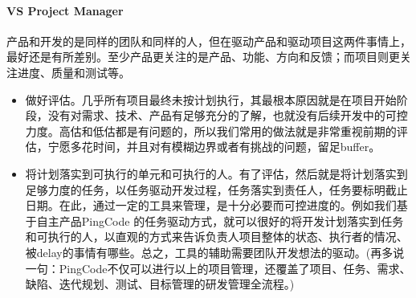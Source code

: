 \documentclass[letterpaper,10pt,english]{sphinxmanual}
\begin{document}
\paragraph{VS Project Manager}
\label{\detokenize{chapter_knowledge/project_manage:vs-project-manager}}
产品和开发的是同样的团队和同样的人，但在驱动产品和驱动项目这两件事情上，最好还是有所差别。至少产品更关注的是产品、功能、方向和反馈；而项目则更关注进度、质量和测试等。
\begin{itemize}
\item {} 
做好评估。几乎所有项目最终未按计划执行，其最根本原因就是在项目开始阶段，没有对需求、技术、产品有足够充分的了解，也就没有后续开发中的可控力度。高估和低估都是有问题的，所以我们常用的做法就是非常重视前期的评估，宁愿多花时间，并且对有模糊边界或者有挑战的问题，留足buffer。

\item {} 
将计划落实到可执行的单元和可执行的人。有了评估，然后就是将计划落实到足够力度的任务，以任务驱动开发过程，任务落实到责任人，任务要标明截止日期。在此，通过一定的工具来管理，是十分必要而可控进度的。例如我们基于自主产品PingCode
的任务驱动方式，就可以很好的将开发计划落实到任务和可执行的人，以直观的方式来告诉负责人项目整体的状态、执行者的情况、被delay的事情有哪些。总之，工具的辅助需要团队开发想法的驱动。(再多说一句：PingCode不仅可以进行以上的项目管理，还覆盖了项目、任务、需求、缺陷、迭代规划、测试、目标管理的研发管理全流程。)

\end{itemize}
\end{document}
